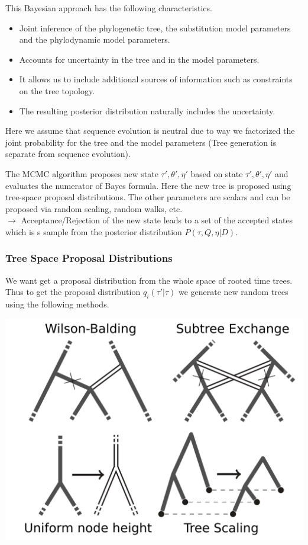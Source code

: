 \documentclass{article}
\begin{document}
\begin{multicols*}{3}
This Bayesian approach has the following characteristics. 
\begin{itemize}
    \item Joint inference of the phylogenetic tree, the substitution model parameters and the phylodynamic model parameters. 
    \item Accounts for uncertainty in the tree and in the model parameters. 
    \item It allows us to include additional sources of information such as constraints on the tree topology.
    \item The resulting posterior distribution naturally includes the uncertainty. 
\end{itemize}

Here we assume that sequence evolution is neutral due to way we factorized the joint probability for the tree and the model parameters (Tree generation is separate from sequence evolution).

The MCMC algorithm proposes new state $\tau ', \theta ', \eta '$ based on state $\tau ', \theta ', \eta '$ and evaluates the numerator of Bayes formula. Here the new tree is proposed using tree-space proposal distributions. The other parameters are scalars and can be proposed via random scaling, random walks, etc.\\

$\rightarrow$ Acceptance/Rejection of the new state leads to a set of the accepted states which is s sample from the posterior distribution $P(\tau, Q, \eta|D)$.
\subsubsection{Tree Space Proposal Distributions}

We want get a proposal distribution from the whole space of rooted time trees. Thus to get the proposal distribution $q_i(\tau'|\tau)$ we generate new random trees using the following methods. 

\begin{center}
    \includegraphics[width=1\linewidth, angle=0.0]{treeproposal.png}
\end{center}


\end{multicols*}
\end{document}
